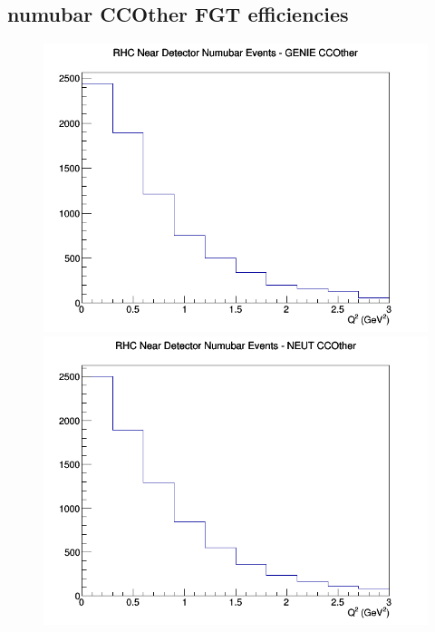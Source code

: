 \documentclass[12pt]{article}
\begin{document}
\subsection{numubar CCOther FGT efficiencies}
\begin{figure}[h]
\includegraphics[width=\linewidth]{eff_Q2/FGT/CCOther_RHC_ND_numubar_Q2_GENIE.png}
\endminipage
{}
\includegraphics[width=\linewidth]{eff_Q2/FGT/CCOther_RHC_ND_numubar_Q2_NEUT.png}
\endminipage
{}

\end{figure}
\end{document}
